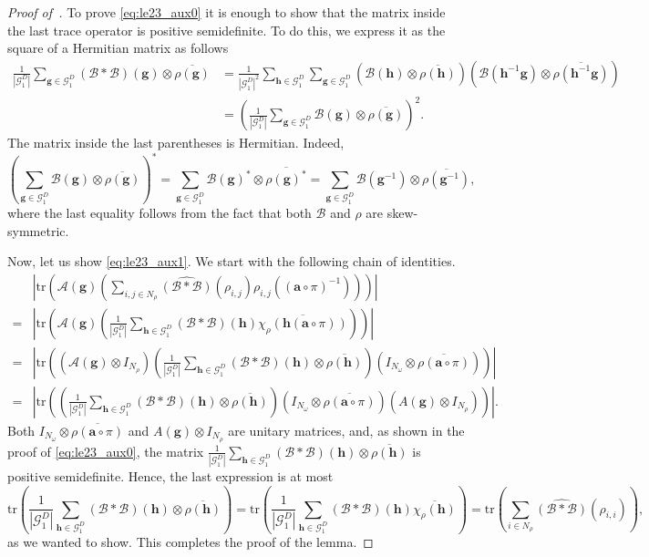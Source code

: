 \documentclass[a4paper,11pt]{article}
\theoremstyle{definition}
\newcommand{\tuple}[1]{{\mathbf{#1}}}
\newcommand{\gr}{\mathscr{G}}
\newcommand{\ba}{\mathbf{a}}
\newcommand{\bg}{\mathbf{g}}
\newcommand{\tr}{\mathrm{tr}}
\newcommand{\A}{\mathcal{A}}
\newcommand{\B}{\mathcal{B}}
\begin{document}
\begin{proof}[Proof of~]
To prove \eqref{eq:le23_aux0} it is enough to show that the matrix inside the last trace operator is positive semidefinite. To do this, we express it as the square of a Hermitian matrix as follows
\begin{align*}
\frac{1}{|\gr_1^D|}
  \sum_{\tuple{g}\in \gr_1^D}
(\B*\B)(\tuple{g})\otimes \overline{\rho(\tuple{g})}
& =
\frac{1}{|\gr_1^D|^2}
\sum_{\tuple{h}\in \gr_1^D}
  \sum_{\tuple{g}\in \gr_1^D}
  \left(
\B(\tuple{h})\otimes \overline{\rho(\tuple{h})}\right)
\left(
\B(\tuple{h}^{-1}\tuple{g})\otimes \overline{\rho(\tuple{h}^{-1}\tuple{g})}
\right) \\
& =
\left(
\frac{1}{|\gr_1^D|}
\sum_{\tuple{g}\in \gr_1^D}
\B(\tuple{g})\otimes \overline{\rho(\tuple{g})}\right)^2.
\end{align*}
The matrix inside the last parentheses is Hermitian.  Indeed,
\[
\left(\sum_{\tuple{g}\in \gr_1^D} \B(\tuple{g})\otimes \overline{\rho(\tuple{g})}\right)^* =
\sum_{\tuple{g}\in \gr_1^D} \B(\tuple{g})^*\otimes \overline{\rho(\tuple{g})^*}= 
\sum_{\tuple{g}\in \gr_1^D} \B(\tuple{g}^{-1})\otimes \overline{\rho(\tuple{g}^{-1})},
\]
where the last equality follows from the fact that both $\B$ and $\rho$ are skew-symmetric. \par
Now, let us show \eqref{eq:le23_aux1}. We start with the following chain of identities. 
\begin{align*}
&
    \left\vert \tr
\left(
\A(\tuple{g}) 
\left(\sum_{i,j\in N_\rho}
\widehat{(\B*\B)}(\rho_{i,j})\rho_{i,j}((\ba\circ\pi)^{-1})
\right)
\right)
\right\vert \\= &
\left\vert \tr
\left(
\A(\tuple{g})
 \left(
\frac{1}{|\gr_1^D|}
\sum_{\tuple{h}\in \gr_1^D}
(\B*\B)(\tuple{h})\overline{\chi_\rho(\tuple{h} (\ba\circ\pi))} \right)
\right)
\right\vert \\ = 
&
\left\vert
\tr
\left(
(\A(\tuple{g})\otimes I_{N_\rho}) 
\left(
\frac{1}{|\gr_1^D|}\sum_{\tuple{h}\in \gr_1^D}
(\B*\B)(\tuple{h}) \otimes \overline{\rho(\tuple{h})}
\right)
\left(I_{N_\omega}\otimes \overline{\rho(\ba\circ\pi)}
\right)
\right)
\right\vert \\ = 
&
\left\vert 
\tr
\left(
\left(
\frac{1}{|\gr_1^D|}
\sum_{\tuple{h}\in \gr_1^D}
(\B*\B)(\tuple{h}) \otimes \overline{\rho(\tuple{h})} 
\right)
\left(I_{N_\omega}\otimes \overline{\rho(\ba\circ\pi)}\right)
\left( A(\tuple{g})\otimes I_{N_\rho}\right)
\right)
\right\vert.
\end{align*}
Both $I_{N_\omega}\otimes \overline{\rho(\ba\circ\pi)}$ and 
$A(\bg)\otimes I_{N_\rho}$ are unitary matrices, and, as shown in the proof of \eqref{eq:le23_aux0}, the matrix $
\frac{1}{|\gr_1^D|}
\sum_{\tuple{h}\in \gr_1^D}
(\B*\B)(\tuple{h}) \otimes \overline{\rho(\tuple{h})}$ is positive semidefinite. Hence, the last expression is at most 
\[
\tr\left(\frac{1}{|\gr_1^D|}
\sum_{\tuple{h}\in \gr_1^D}
(\B*\B)(\tuple{h}) \otimes \overline{\rho(\tuple{h})} 
\right) = \tr\left(
\frac{1}{|\gr_1^D|}
\sum_{\tuple{h}\in \gr_1^D}
(\B*\B)(\tuple{h}) \overline{\chi_\rho(\tuple{h})} 
\right) = 
 \tr\left(
\sum_{i\in N_\rho}
\widehat{(\B*\B)}(\rho_{i,i}) 
\right),
\]
as we wanted to show. This completes the proof of the lemma. 
\end{proof}
\end{document}
